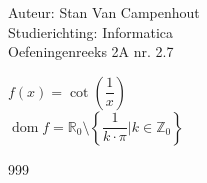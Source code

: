 \documentclass[a4paper]{article}
\begin{document}
  
\noindent \large Auteur: Stan Van Campenhout \\
\noindent \large Studierichting:  Informatica\\
\noindent \large Oefeningenreeks 2A nr. 2.7\\

\medskip

\normalsize

$ f(x) = \cot\left(\dfrac{1}{x}\right) $\\

$\operatorname{dom} f= \mathbb{R}_{0} \setminus \left\{ \dfrac{1}{k \cdot \pi} | k \in \mathbb{Z}_{0} \right\} $\\

\begin{thebibliography}{999}
\end{thebibliography}
\end{document}
